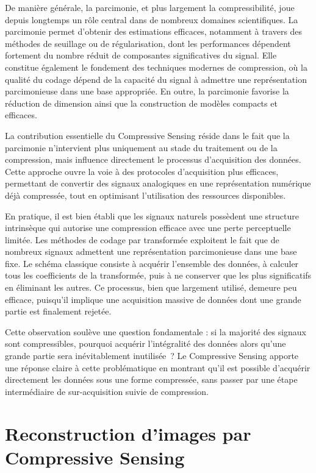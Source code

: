 De manière générale, la parcimonie, et plus largement la compressibilité, joue depuis
longtemps un rôle central dans de nombreux domaines scientifiques. La parcimonie
permet d'obtenir des estimations efficaces, notamment à travers des méthodes de
seuillage ou de régularisation, dont les performances dépendent fortement du nombre
réduit de composantes significatives du signal. Elle constitue également le fondement
des techniques modernes de compression, où la qualité du codage dépend de la
capacité du signal à admettre une représentation parcimonieuse dans une base
appropriée. En outre, la parcimonie favorise la réduction de dimension ainsi que la
construction de modèles compacts et efficaces.

La contribution essentielle du Compressive Sensing réside dans le fait que la
parcimonie n'intervient plus uniquement au stade du traitement ou de la compression,
mais influence directement le processus d'acquisition des données. Cette approche
ouvre la voie à des protocoles d'acquisition plus efficaces, permettant de convertir des
signaux analogiques en une représentation numérique déjà compressée, tout en
optimisant l'utilisation des ressources disponibles.

En pratique, il est bien établi que les signaux naturels possèdent une structure
intrinsèque qui autorise une compression efficace avec une perte perceptuelle limitée.
Les méthodes de codage par transformée exploitent le fait que de nombreux signaux
admettent une représentation parcimonieuse dans une base fixe. Le schéma classique
consiste à acquérir l'ensemble des données, à calculer tous les coefficients de la
transformée, puis à ne conserver que les plus significatifs en éliminant les autres. Ce
processus, bien que largement utilisé, demeure peu efficace, puisqu'il implique une
acquisition massive de données dont une grande partie est finalement rejetée.

Cette observation soulève une question fondamentale : si la majorité des signaux sont
compressibles, pourquoi acquérir l'intégralité des données alors qu'une grande partie
sera inévitablement inutilisée~? Le Compressive Sensing apporte une réponse claire à
cette problématique en montrant qu'il est possible d'acquérir directement les données
sous une forme compressée, sans passer par une étape intermédiaire de
sur-acquisition suivie de compression.

\section{Reconstruction d'images par Compressive Sensing}

